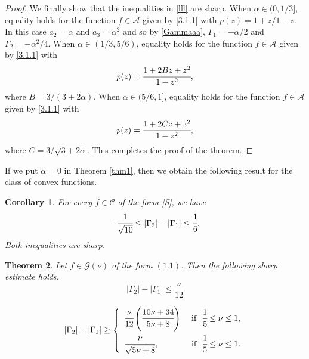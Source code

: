 \documentclass[a4paper,12pt]{amsart}
\newtheorem{theorem}{Theorem}[section]
\newtheorem{corollary}[theorem]{Corollary}
\theoremstyle{definition}
\numberwithin{equation}{section}
\begin{document}
\begin{proof}
\noindent We finally show that the inequalities in \eqref{lll} are sharp. When $\alpha \in (0,1/3]$, equality holds for the function $f \in \mathcal{A}$ given by \eqref{3.1.1} with $p(z)=1+z/1-z$. In this case $a_2=\alpha$ and $a_3=\alpha^2$ and so by \eqref{Gammaaa}, $\Gamma_1=-\alpha/2$  and $\Gamma_2=-\alpha^2/4$. When $\alpha \in (1/3,5/6)$, equality holds for the function $f \in \mathcal{A}$ given by \eqref{3.1.1} with 
$$
p(z)=\cfrac{1+2Bz+z^2}{1-z^2},
$$
where $B=3/(3+2\alpha)$.  When $ \alpha \in (5/6,1]$, equality holds for the function $f \in \mathcal{A}$ given by \eqref{3.1.1} with 
$$
p(z)=\cfrac{1+2Cz+z^2}{1-z^2},
$$
where $C=3/\sqrt{3+2\alpha}$. This completes the proof of the theorem. 
\end{proof}	
	
If we put $\alpha=0$ in Theorem \ref{thm1}, then we obtain the following result for the class of convex functions.

\begin{corollary}
	For every $f\in \mathcal{C}$ of the form \eqref{S}, we have
	\begin{equation}\label{C}
	-\cfrac{1}{\sqrt{10}}\le	|\Gamma_2|-|\Gamma_1|\le \cfrac{1}{6}.
	\end{equation}
Both inequalities are sharp.
\end{corollary}	
	
\begin{theorem}\label{1}
Let $f\in \mathcal{G}(\nu)$ of the form $(1.1)$. Then the following sharp estimate holds.
\begin{equation}
|\Gamma_2|-|\Gamma_1| \leq \frac{\nu}{12}
\end{equation}

\begin{equation}\label{inverse1}
	|\Gamma_2|-|\Gamma_1|\ge \left \{
	\begin{array}{ll}
		\cfrac{\nu}{12}\left( \cfrac{10\nu+34}{5\nu+8} \right) & {\mbox{ if }} \,\,  \cfrac{1}{5} \leq \nu \leq 1,
		\\[4mm]
		\cfrac{\nu}{\sqrt{5\nu+8}}, & {\mbox{ if }} \,\, \cfrac{1}{5} \leq \nu \leq 1.
	\end{array}
	\right.
\end{equation} 
 \end{theorem}
\end{document}
